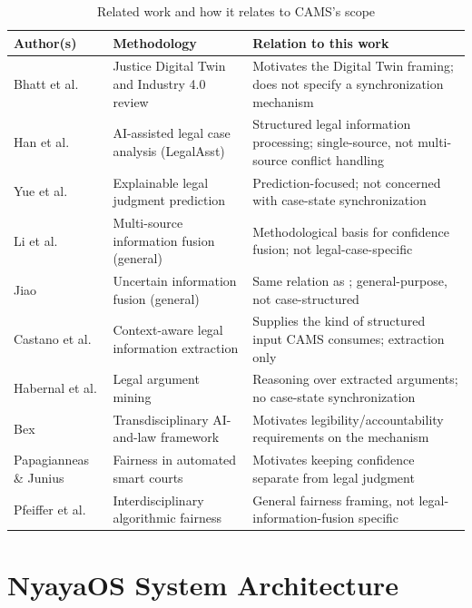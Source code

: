 \documentclass[conference]{IEEEtran}
\begin{document}
\begin{table}[t]
\centering
\caption{Related work and how it relates to CAMS's scope}
\label{tab:relatedwork}
\begin{tabular}{L{2.6cm}L{5.2cm}L{8.5cm}}
\toprule
{}
\textcolor{headertext}{\textbf{Author(s)}} & \textcolor{headertext}{\textbf{Methodology}} & \textcolor{headertext}{\textbf{Relation to this work}} \\
\midrule
Bhatt et al. \cite{bhatt2024} & Justice Digital Twin and Industry 4.0 review & Motivates the Digital Twin framing; does not specify a synchronization mechanism \\
Han et al. \cite{han2024} & AI-assisted legal case analysis (LegalAsst) & Structured legal information processing; single-source, not multi-source conflict handling \\
Yue et al. \cite{yue2024} & Explainable legal judgment prediction & Prediction-focused; not concerned with case-state synchronization \\
Li et al. \cite{li2024} & Multi-source information fusion (general) & Methodological basis for confidence fusion; not legal-case-specific \\
Jiao \cite{jiao2024} & Uncertain information fusion (general) & Same relation as \cite{li2024}; general-purpose, not case-structured \\
Castano et al. \cite{castano2024} & Context-aware legal information extraction & Supplies the kind of structured input CAMS consumes; extraction only \\
Habernal et al. \cite{habernal2024} & Legal argument mining & Reasoning over extracted arguments; no case-state synchronization \\
Bex \cite{bex2025} & Transdisciplinary AI-and-law framework & Motivates legibility/accountability requirements on the mechanism \\
Papagianneas \& Junius \cite{papagianneas2023} & Fairness in automated smart courts & Motivates keeping confidence separate from legal judgment \\
Pfeiffer et al. \cite{pfeiffer2023} & Interdisciplinary algorithmic fairness & General fairness framing, not legal-information-fusion specific \\
\bottomrule
\end{tabular}
\end{table}

\section{NyayaOS System Architecture}
\label{sec:architecture}
\end{document}
